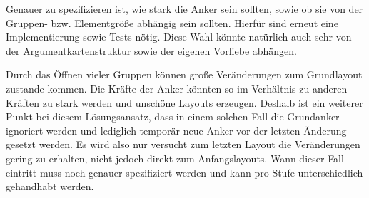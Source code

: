 Genauer zu spezifizieren ist, wie stark die Anker sein sollten, sowie ob sie von der Gruppen- bzw. Elementgröße abhängig sein sollten. 
Hierfür sind erneut eine Implementierung sowie Tests nötig. Diese Wahl könnte natürlich auch sehr von der Argumentkartenstruktur sowie der eigenen Vorliebe abhängen.

Durch das Öffnen vieler Gruppen können große Veränderungen zum Grundlayout zustande kommen.
Die Kräfte der Anker könnten so im Verhältnis zu anderen Kräften zu stark werden und unschöne Layouts erzeugen.
Deshalb ist ein weiterer Punkt bei diesem Lösungsansatz, dass in einem solchen Fall die Grundanker ignoriert werden 
und lediglich temporär neue Anker vor der letzten Änderung gesetzt werden. 
Es wird also nur versucht zum letzten Layout die Veränderungen gering zu erhalten, nicht jedoch direkt zum Anfangslayouts. 
Wann dieser Fall eintritt muss noch genauer spezifiziert werden und kann pro Stufe unterschiedlich gehandhabt werden.


